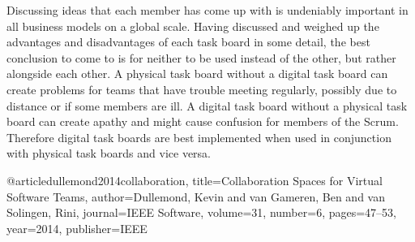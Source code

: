 \documentclass{scrartcl}
\begin{document}
Discussing ideas that each member has come up with is undeniably important in all business models on a global scale. Having discussed and weighed up the advantages and disadvantages of each task board in some detail, the best conclusion to come to is for neither to be used instead of the other, but rather alongside each other. A physical task board without a digital task board can create problems for teams that have trouble meeting regularly, possibly due to distance or if some members are ill. A digital task board without a physical task board can create apathy and might cause confusion for members of the Scrum. Therefore digital task boards are best implemented when used in conjunction with physical task boards and vice versa.




@article{dullemond2014collaboration,
  title={Collaboration Spaces for Virtual Software Teams},
  author={Dullemond, Kevin and van Gameren, Ben and van Solingen, Rini},
  journal={IEEE Software},
  volume={31},
  number={6},
  pages={47--53},
  year={2014},
  publisher={IEEE}
}
\end{document}
